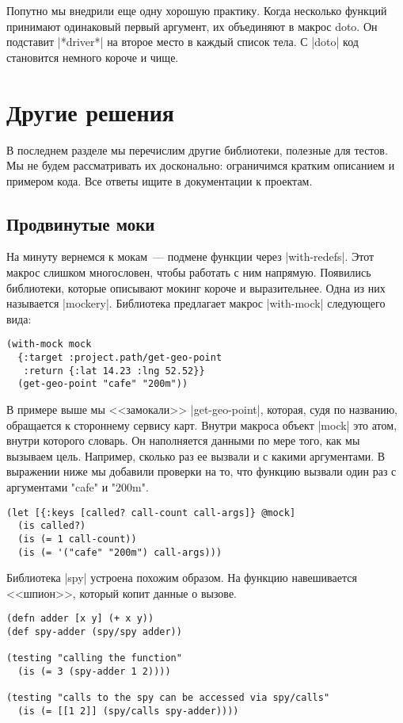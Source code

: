 Попутно мы внедрили еще одну хорошую практику. Когда несколько функций принимают
одинаковый первый аргумент, их объединяют в макрос doto. Он подставит \spverb|*driver*|
на второе место в каждый список тела. С \spverb|doto| код становится немного короче и
чище.

\section{Другие решения}

В последнем разделе мы перечислим другие библиотеки, полезные для тестов. Мы не
будем рассматривать их досконально: ограничимся кратким описанием и примером
кода. Все ответы ищите в документации к проектам.

\subsection{Продвинутые моки}

На минуту вернемся к мокам~--- подмене функции через \spverb|with-redefs|. Этот макрос
слишком многословен, чтобы работать с ним напрямую. Появились библиотеки,
которые описывают мокинг короче и выразительнее. Одна из них называется
\spverb|mockery|. Библиотека предлагает макрос \spverb|with-mock| следующего вида:

\begin{verbatim}
(with-mock mock
  {:target :project.path/get-geo-point
   :return {:lat 14.23 :lng 52.52}}
  (get-geo-point "cafe" "200m"))
\end{verbatim}

В примере выше мы <<замокали>> \spverb|get-geo-point|, которая, судя по названию,
обращается к стороннему сервису карт. Внутри макроса объект \spverb|mock| это атом,
внутри которого словарь. Он наполняется данными по мере того, как мы вызываем
цель. Например, сколько раз ее вызвали и с какими аргументами. В выражении ниже
мы добавили проверки на то, что функцию вызвали один раз с аргументами "cafe" и
"200m".

\begin{verbatim}
(let [{:keys [called? call-count call-args]} @mock]
  (is called?)
  (is (= 1 call-count))
  (is (= '("cafe" "200m") call-args)))
\end{verbatim}

Библиотека \spverb|spy| устроена похожим образом. На функцию навешивается <<шпион>>,
который копит данные о вызове.

\begin{verbatim}
(defn adder [x y] (+ x y))
(def spy-adder (spy/spy adder))

(testing "calling the function"
  (is (= 3 (spy-adder 1 2))))

(testing "calls to the spy can be accessed via spy/calls"
  (is (= [[1 2]] (spy/calls spy-adder))))
\end{verbatim}

